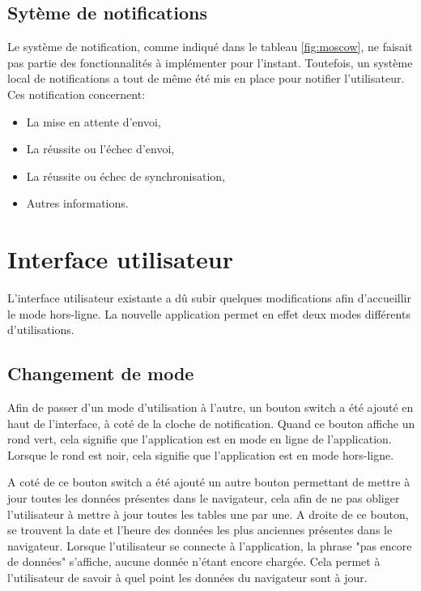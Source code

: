\documentclass{EPL-master-thesis-covers-FR}
\begin{document}
			\subsection*{Sytème de notifications}
				Le système de notification, comme indiqué dans le tableau \ref{fig:moscow}, ne faisait pas partie des fonctionnalités à implémenter pour l'instant. Toutefois, un système local de notifications a tout de même été mis en place pour notifier l'utilisateur. Ces notification concernent:
				
				\begin{itemize}
					\item La mise en attente d'envoi,
					\item La réussite ou l'échec d'envoi,
					\item La réussite ou échec de synchronisation,
					\item Autres informations.
				\end{itemize}								
				
		
		\section{Interface utilisateur}
			L'interface utilisateur existante a dû subir quelques modifications afin d'accueillir le mode hors-ligne. La nouvelle application permet en effet deux modes différents d'utilisations.
			
			\subsection*{Changement de mode}
				Afin de passer d'un mode d'utilisation à l'autre, un bouton switch a été ajouté en haut de l'interface, à coté de la cloche de notification. Quand ce bouton affiche un rond vert, cela signifie que l'application est en mode en ligne de l'application. Lorsque le rond est noir, cela signifie que l'application est en mode hors-ligne.
				
				 A coté de ce bouton switch a été ajouté un autre bouton permettant de mettre à jour toutes les données présentes dans le navigateur, cela afin de ne pas obliger l'utilisateur à mettre à jour toutes les tables une par une. A droite de ce bouton, se trouvent la date et l'heure des données les plus anciennes présentes dans le navigateur. Lorsque l'utilisateur se connecte à l'application, la phrase "pas encore de données" s'affiche, aucune donnée n'étant encore chargée. Cela permet à l'utilisateur de savoir à quel point les données du navigateur sont à jour.
				
\end{document}
